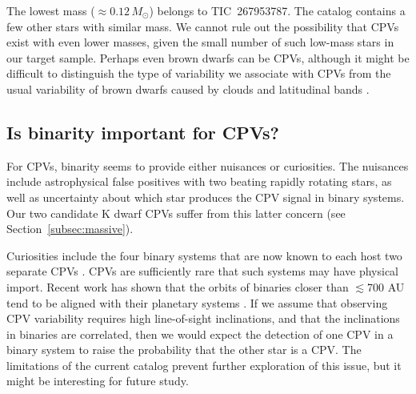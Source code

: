 \documentclass[11pt,twocolumn,tighten]{aastex63}
\begin{document}
The lowest mass ($\approx$$0.12$\,$M_\odot$) belongs to TIC~267953787.
The catalog contains a few other stars with similar mass.  We cannot
rule out the possibility that CPVs exist with even lower masses, given
the small number of such low-mass stars in our target sample.  Perhaps
even brown dwarfs can be CPVs, although it might be difficult to
distinguish the type of variability we associate with CPVs from the
usual variability of brown dwarfs caused by clouds and latitudinal
bands \citep[e.g.][]{2021ApJ...906...64A,2022ApJ...924...68V}.



\subsection{Is binarity important for CPVs?}
\label{subsec:discbinary}

For CPVs, binarity seems to provide either nuisances or curiosities.
The nuisances include astrophysical false positives with two beating
rapidly rotating stars, as well as uncertainty about which star
produces the CPV signal in binary systems.  Our two candidate K dwarf
CPVs suffer from this latter concern (see
Section~\ref{subsec:massive}).

Curiosities include the four binary systems that are now known to each
host two separate CPVs .  CPVs are sufficiently rare that such systems
may have physical import.  Recent work has shown that the orbits of
binaries closer than $\lesssim$700 AU tend to be aligned with their
planetary systems \citep[e.g.][]{2022AJ....163..207C}.  If we assume
that observing CPV variability requires high line-of-sight
inclinations, and that the inclinations in binaries are correlated,
then we would expect the detection of one CPV in a binary system to
raise the probability that the other star is a CPV.  The limitations
of the current catalog prevent further exploration of this issue, but
it might be interesting for future study.

\end{document}
